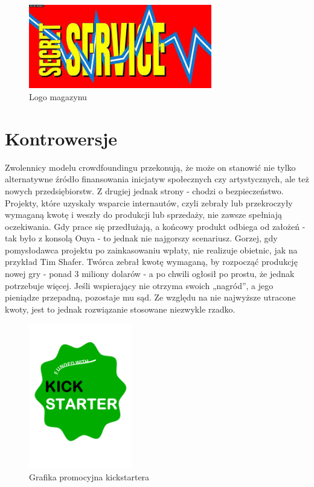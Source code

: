 \documentclass[12pt, a4paper]{article}
\begin{document}
\begin{figure}[ht]
\centering
\includegraphics[width=8cm]{ss}
\caption{Logo magazynu}
\label{fig:obrazek k}
\end{figure}

\section{Kontrowersje}

Zwolennicy modelu crowdfoundingu przekonują, że może on stanowić nie tylko alternatywne źródło finansowania inicjatyw społecznych czy artystycznych, ale też nowych przedsiębiorstw. Z drugiej jednak strony - chodzi o bezpieczeństwo. Projekty, które uzyskały wsparcie internautów, czyli zebrały lub przekroczyły wymaganą kwotę i weszły do produkcji lub sprzedaży, nie zawsze spełniają oczekiwania. Gdy prace się przedłużają, a końcowy produkt odbiega od założeń - tak było z konsolą Ouya - to jednak nie najgorszy scenariusz. Gorzej, gdy pomysłodawca projektu po zainkasowaniu wpłaty, nie realizuje obietnic, jak na przykład Tim Shafer. Twórca zebrał kwotę wymaganą, by rozpocząć produkcję nowej gry - ponad 3 miliony dolarów - a po chwili ogłosił po prostu, że jednak potrzebuje więcej.
Jeśli wspierający nie otrzyma swoich „nagród”, a jego pieniądze przepadną, pozostaje mu sąd. Ze względu na nie najwyższe utracone kwoty, jest to jednak rozwiązanie stosowane niezwykle rzadko.

\begin{figure}[!ht]
	\centering
		\includegraphics[width=0.40\textwidth]{rys.pdf}
	\caption{Grafika promocyjna kickstartera}
	\label{fig:rys}
\end{figure}
\end{document}
